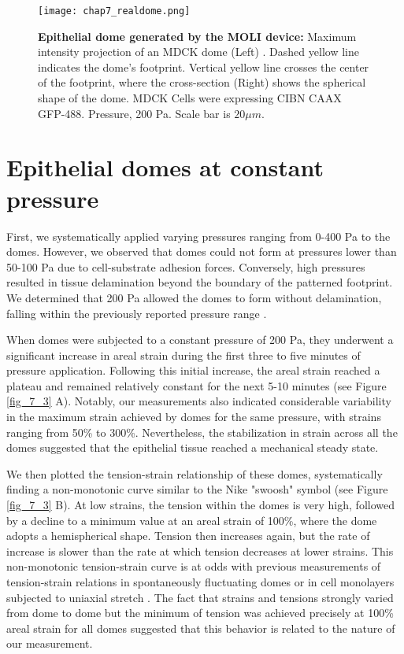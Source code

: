 \begin{figure}
	\centering
	\texttt{[image: chap7\_realdome.png]}
	\caption{\textbf{Epithelial dome generated by the MOLI device:} Maximum intensity projection of an MDCK dome (Left) . Dashed yellow line indicates the dome's footprint. Vertical yellow line crosses the center of the footprint, where the cross-section   (Right) shows the spherical shape of the dome. MDCK Cells were expressing CIBN CAAX GFP-488. Pressure, 200 Pa. Scale bar is $20 \mu m$.
	} \label{fig_7_1}
\end{figure}

\hypertarget{epithelial-domes-at-constant-pressure}{%
	\section{Epithelial domes at constant
		pressure}\label{epithelial-domes-at-constant-pressure}}

First, we systematically applied varying pressures ranging from 0-400 \unit{\pascal} to the domes. However, we observed that domes could not form at pressures lower than 50-100 \unit{\pascal} due to cell-substrate adhesion forces. Conversely, high pressures resulted in tissue delamination beyond the boundary of the patterned footprint. We determined that 200 \unit{\pascal} allowed the domes to form without delamination, falling within the previously reported pressure range \cite{choudhury2022,marin-llaurado2022}.

When domes were subjected to a constant pressure of 200 \unit{\pascal}, they underwent a significant increase in areal strain during the first three to five minutes of pressure application. Following this initial increase, the areal strain reached a plateau and remained relatively constant for the next 5-10 minutes (see Figure \ref{fig_7_3} A). Notably, our measurements also indicated considerable variability in the maximum strain achieved by domes for the same pressure, with strains ranging from 50\% to 300\%. Nevertheless, the stabilization in strain across all the domes suggested that the epithelial tissue reached a mechanical steady state.

We then plotted the tension-strain relationship of these domes, systematically finding a non-monotonic curve similar to the Nike "swoosh" symbol (see Figure \ref{fig_7_3} B). At low strains, the tension within the domes is very high, followed by a decline to a minimum value at an areal strain of 100\%, where the dome adopts a hemispherical shape. Tension then increases  again, but the rate of increase is slower than the rate at which tension decreases at lower strains. This non-monotonic tension-strain curve is at odds with previous measurements of tension-strain relations in spontaneously fluctuating domes \cite{latorre2018,marin-llaurado2022} or in cell monolayers subjected to uniaxial stretch \cite{duque2023}. The fact that strains and tensions strongly varied from dome to dome but the minimum of tension was achieved precisely at 100\% areal strain for all domes suggested that this behavior is related to the nature of our measurement. 

